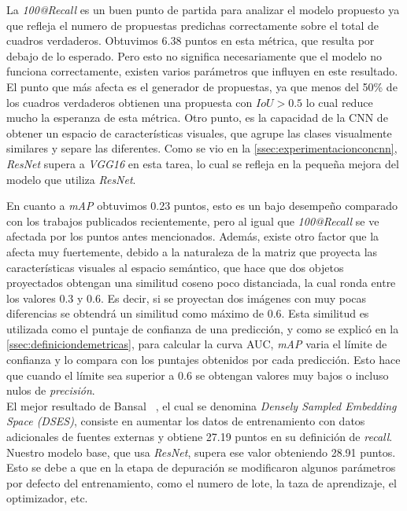La \textit{100@Recall} es un buen punto de partida para analizar el modelo propuesto ya que refleja el numero de propuestas predichas correctamente sobre el total de cuadros verdaderos. Obtuvimos 6.38 puntos en esta métrica, que resulta por debajo de lo esperado. Pero esto no significa necesariamente que el modelo no funciona correctamente, existen varios parámetros que influyen en este resultado. El punto que más afecta es el generador de propuestas, ya que menos del 50\% de los cuadros verdaderos obtienen una propuesta con $IoU > 0.5$ lo cual reduce mucho la esperanza de esta métrica. Otro punto, es la capacidad de la CNN de obtener un espacio de características visuales, que agrupe las clases visualmente similares y separe las diferentes. Como se vio en la \autoref{ssec:experimentacionconcnn}, \textit{ResNet} supera a \textit{VGG16} en esta tarea, lo cual se refleja en la pequeña mejora del modelo que utiliza  \textit{ResNet}.

En cuanto a \textit{mAP} obtuvimos 0.23 puntos, esto es un bajo desempeño comparado con los trabajos publicados recientemente, pero al igual que \textit{100@Recall} se ve afectada por los puntos antes mencionados. Además, existe otro factor que la afecta muy fuertemente, debido a la naturaleza de la matriz que proyecta las características visuales al espacio semántico, que hace que dos objetos proyectados obtengan una similitud coseno poco distanciada, la cual ronda entre los valores 0.3 y 0.6. Es decir, si se proyectan dos imágenes con muy pocas diferencias se obtendrá un similitud como máximo de 0.6. Esta similitud es utilizada como el puntaje de confianza de una predicción, y como se explicó en la \autoref{ssec:definiciondemetricas}, para calcular la curva AUC, \textit{mAP} varia el límite de confianza y lo compara con los puntajes obtenidos por cada predicción. Esto hace que cuando el límite sea superior a 0.6 se obtengan valores muy bajos o incluso nulos de \textit{precisión}.\\


El mejor resultado de Bansal \etal~\cite{bansal2018zero}, el cual se denomina \textit{Densely Sampled Embedding Space (DSES)}, consiste en aumentar los datos de entrenamiento con datos adicionales de fuentes externas y obtiene 27.19 puntos en su definición de \textit{recall}. Nuestro modelo base, que usa \textit{ResNet}, supera ese valor obteniendo 28.91 puntos. Esto se debe a que en la etapa de depuración se modificaron algunos parámetros por defecto del entrenamiento, como el numero de lote, la taza de aprendizaje, el optimizador, etc.  

